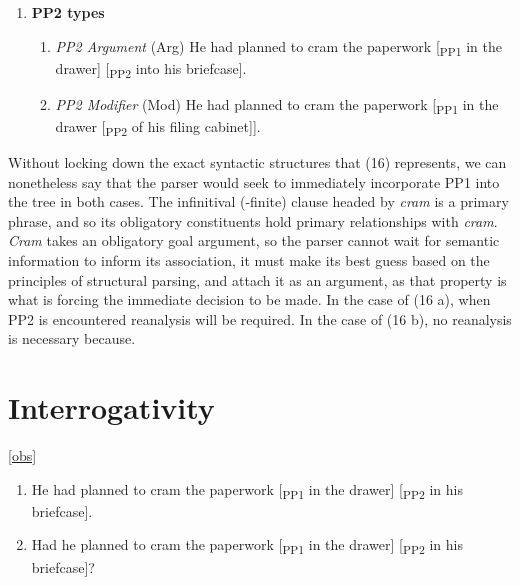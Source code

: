 \documentclass[12pt,oneside]{book}
\providecommand{\tightlist}{%
  \setlength{\itemsep}{0pt}\setlength{\parskip}{0pt}}
\begin{document}
\begin{enumerate}
\def\labelenumi{(\arabic{enumi})}
\setcounter{enumi}{15}
\tightlist
\item
  \textbf{PP2 types}

  \begin{enumerate}
  \def\labelenumii{(\alph{enumii})}
  \tightlist
  \item
    \emph{PP2 Argument} (Arg)
    He had planned to cram the paperwork {[}\textsubscript{PP1} in the drawer{]} {[}\textsubscript{PP2} into his briefcase{]}.
  \item
    \emph{PP2 Modifier} (Mod)
    He had planned to cram the paperwork {[}\textsubscript{PP1} in the drawer {[}\textsubscript{PP2} of his filing cabinet{]}{]}.
  \end{enumerate}
\end{enumerate}

Without locking down the exact syntactic structures that (16) represents, we can nonetheless say that the parser would seek to immediately incorporate PP1 into the tree in both cases. The infinitival (-finite) clause headed by \emph{cram} is a primary phrase, and so its obligatory constituents hold primary relationships with \emph{cram}. \emph{Cram} takes an obligatory goal argument, so the parser cannot wait for semantic information to inform its association, it must make its best guess based on the principles of structural parsing, and attach it as an argument, as that property is what is forcing the immediate decision to be made. In the case of (16 a), when PP2 is encountered reanalysis  will be required. In the case of (16 b), no reanalysis is necessary because.

\hypertarget{interrogativity}{%
\section{Interrogativity}\label{interrogativity}}

 \ref{obs} 

\begin{enumerate}
\def\labelenumi{(\arabic{enumi})}
\setcounter{enumi}{16}
\tightlist
\item
  He had planned to cram the paperwork {[}\textsubscript{PP1} in the drawer{]} {[}\textsubscript{PP2} in his briefcase{]}.
\item
  Had he planned to cram the paperwork {[}\textsubscript{PP1} in the drawer{]} {[}\textsubscript{PP2} in his briefcase{]}?
\end{enumerate}
\end{document}

